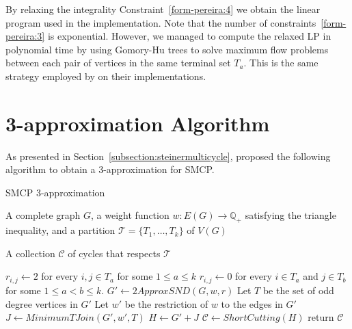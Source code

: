 By relaxing the integrality Constraint~\eqref{form-pereira:4} we obtain the linear program used in the implementation. Note that the number of constraints~\eqref{form-pereira:3} is exponential. However, we managed to compute the relaxed LP in polynomial time by using Gomory-Hu trees to solve maximum flow problems between each pair of vertices in the same terminal set \(T_a\). This is the same strategy employed by \cite{Pereira2018TheSM} on their implementations.

\section{3-approximation Algorithm}

As presented in Section~\ref{subsection:steinermulticycle}, \cite{smcp_3apx} proposed the following algorithm to obtain a 3-approximation for SMCP.

\begin{algorithm}
\caption{SMCP 3-approximation}
\label{algorithm:smcp-3-apx}
\begin{algorithmic}[1]

\Require A complete graph \(G\), a weight function \(w: E(G) \rightarrow \mathbb{Q}_+\) satisfying the triangle inequality, and a partition \(\mathcal{T} = \{T_1, \dots, T_k\}\) of \(V(G)\)

\Ensure A collection \(\mathcal{C}\) of cycles that respects \(\mathcal{T}\)

\State \(r_{i, j} \gets 2\) for every \(i, j \in T_a\) for some \(1 \leq a \leq  k\)
\State \(r_{i, j} \gets 0\) for every \(i \in T_a\) and \(j \in T_b\) for some \(1 \leq a < b \leq k\).
\State \(G' \gets 2ApproxSND(G, w, r)\) \label{alg:3-apx:snd-2-apx}
\State Let \(T\) be the set of odd degree vertices in \(G'\)
\State Let \(w'\) be the restriction of \(w\) to the edges in \(G'\)
\State \(J \gets MinimumTJoin(G', w', T)\) \label{alg:3-apx:t-join}
\State \(H \gets G' + J\)
\State \(\mathcal{C} \gets ShortCutting(H)\) \label{alg:3-apx:shortcutting}
\State return \(\mathcal{C}\)


\end{algorithmic}
\end{algorithm}



